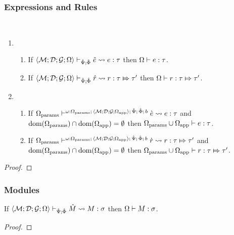 \subsubsection{Expressions and Rules}
\begin{theorem}
\label{thm:typed-expression-expansion-P}
~
\begin{enumerate}
\item \begin{enumerate}
  \item If $\langle \mathcal{M}; \mathcal{D}; \mathcal{G}; \Omega \rangle \vdash_{\hat{\Psi}; \hat\Phi} {\hat e} \leadsto e : \tau$ then $\Omega \vdash e : \tau$.
  \item If $\langle \mathcal{M}; \mathcal{D}; \mathcal{G}; \Omega \rangle \vdash_{\hat{\Psi}; \hat\Phi} \hat{r} \leadsto r : \tau \Mapsto \tau'$ then $\Omega \vdash r : \tau \Mapsto \tau'$.
  \end{enumerate}
\item \begin{enumerate}
  \item If $\Omega_\text{params} \vdash^{\omega : \Omega_\text{params};\,\langle \mathcal{M}; \mathcal{D}; \mathcal{G}; \Omega_\text{app} \rangle;\,\hat{\Psi};\,\hat\Phi;\,b} \grave{e} \leadsto e : \tau$ and $\text{dom}(\Omega_\text{params}) \cap \text{dom}(\Omega_\text{app}) = \emptyset$ then $\Omega_\text{params} \cup \Omega_\text{app} \vdash e : \tau$.
  \item If $\Omega_\text{params} \vdash^{\omega : \Omega_\text{params};\,\langle \mathcal{M}; \mathcal{D}; \mathcal{G}; \Omega_\text{app} \rangle;\,\hat{\Psi};\,\hat\Phi;\,b} \grave{r} \leadsto r : \tau \Mapsto \tau'$ and $\text{dom}(\Omega_\text{params}) \cap \text{dom}(\Omega_\text{app}) = \emptyset$ then $\Omega_\text{params} \cup \Omega_\text{app} \vdash r : \tau \Mapsto \tau'$.
  \end{enumerate}
\end{enumerate}
\end{theorem}
\begin{proof}  \end{proof}

\subsubsection{Modules}

\begin{theorem}
\label{thm:module-expansion-P}
If $\langle \mathcal{M}; \mathcal{D}; \mathcal{G}; \Omega \rangle \vdash_{\hat{\Psi}; \hat\Phi} {\hat M} \leadsto M : \sigma$ then $\Omega \vdash M : \sigma$.
\end{theorem}
\begin{proof}  \end{proof}

